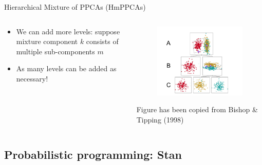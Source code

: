 \documentclass{beamer}
\begin{document}
\begin{frame}{Hierarchical Mixture of PPCAs (HmPPCAs)}
    
    \begin{columns}
\begin{column}{0.5\textwidth}
    \begin{itemize}
        \item We can add more levels: suppose mixture component $k$ consists of multiple sub-components $m$
        \item As many levels can be added as necessary!
    \end{itemize}
\end{column}
\begin{column}{0.5\textwidth}
\begin{figure}
    \centering
    \includegraphics[width=\linewidth]{hierarchy_bishoptipping.png}
\end{figure}
\footnotesize
Figure has been copied from Bishop \& Tipping (1998) \cite{bishop1998hierarchical}
\end{column}
\end{columns}
    
\end{frame}



\subsection{Probabilistic programming: Stan}
\end{document}
